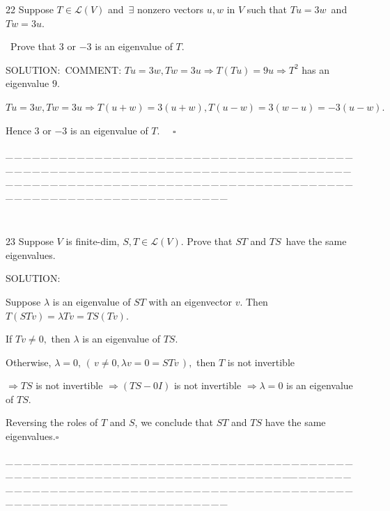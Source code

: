 \documentclass[a4paper, 11pt, UTF8]{article}
\def\Lm{\mathcal{L}}
\begin{document}
\begin{large}
{\timesbf\Large 22} {\timessl\Large 
Suppose $T\in\Lm(V)$ and $\,\exists$ nonzero vectors $u,w$ in $V$ such that $Tu = 3w$ \,{\normalsize\timessl and}\, $Tw = 3u$.}\par\quad\,
{\timessl\Large Prove that $3$ or $-3$ is an eigenvalue of $T$.
}\par
{\timesbf S\footnotesize{OLUTION:}}\,\,\,{\small C{\scriptsize OMMENT}: $Tu=3w,Tw=3u\Rightarrow T(Tu)=9u\Rightarrow T^2$ has an eigenvalue $9.$}\par\quad
$Tu=3w,Tw=3u\Rightarrow T(u+w)=3(u+w),T(u-w)=3(w-u)=-3(u-w).$\par\quad
Hence $3$ or $-3$ is an eigenvalue of $T.$ $\quad\square$\par
{\tiny \_\,\_\,\_\,\_\,\_\,\_\,\_\,\_\,\_\,\_\,\_\,\_\,\_\,\_\,\_\,\_\,\_\,\_\,\_\,\_\,\_\,\_\,\_\,\_\,\_\,\_\,\_\,\_\,\_\,\_\,\_\,\_\,\_\,\_\,\_\,\_\,\_\,\_\,\_\,\_\,\_\,\_\,\_\,\_\,\_\,\_\,\_\,\_\,\_\,\_\,\_\,\_\,\_\,\_\,\_\,\_\,\_\,\_\,\_\,\_\,\_\,\_\,\_\,\_\,\_\,\_\,\_\,\_\,\_\,\_\,\_\_\,\_\,\_\,\_\,\_\,\_\,\_\,\_\,\_\,\_\,\_\,\_\,\_\,\_\,\_\,\_\,\_\,\_\,\_\,\_\,\_\,\_\,\_\,\_\,\_\,\_\,\_\,\_\,\_\,\_\,\_\,\_\,\_\,\_\,\_\,\_\,\_\,\_\,\_\,\_\,\_\,\_\,\_\,\_\,\_\,\_\,\_\,\_\,\_\,\_\,\_\,\_\,\_\,\_\,\_\,\_\,\_\,\_\,\_\,\_\,\_\,\_\,\_\,\_\,\_\,\_\,\_\,\_\,\_\,\_\,\_}\par{\tiny\,\par}

{\timesbf\Large 23} {\timessl\Large 
Suppose $V$ is finite-dim, $S, T\in\Lm(V)$. Prove that $ST$ and $TS$\, have the same eigenvalues.}\par
{\timesbf S\footnotesize{OLUTION:}}\par\quad
Suppose $\lambda$ is an eigenvalue of $ST$ with an eigenvector $v.$ Then $T(STv)=\lambda Tv=TS(Tv).$\par\quad
If $Tv\neq 0,$ then $\lambda$ is an eigenvalue of $TS.$\par\quad
Otherwise, $\lambda=0,\,(\,v\neq 0,\lambda v=0=STv\,),$ then $T$ is not invertible\par\qquad\qquad
 $\Rightarrow TS$ is not invertible $\Rightarrow (TS-0I)$ is not invertible $\Rightarrow \lambda=0$ is an eigenvalue of $TS.$\par\quad
Reversing the roles of $T$ and $S$, we conclude that $ST$ and $TS$ have the same eigenvalues.\quad$\square$\par
{\tiny \_\,\_\,\_\,\_\,\_\,\_\,\_\,\_\,\_\,\_\,\_\,\_\,\_\,\_\,\_\,\_\,\_\,\_\,\_\,\_\,\_\,\_\,\_\,\_\,\_\,\_\,\_\,\_\,\_\,\_\,\_\,\_\,\_\,\_\,\_\,\_\,\_\,\_\,\_\,\_\,\_\,\_\,\_\,\_\,\_\,\_\,\_\,\_\,\_\,\_\,\_\,\_\,\_\,\_\,\_\,\_\,\_\,\_\,\_\,\_\,\_\,\_\,\_\,\_\,\_\,\_\,\_\,\_\,\_\,\_\,\_\_\,\_\,\_\,\_\,\_\,\_\,\_\,\_\,\_\,\_\,\_\,\_\,\_\,\_\,\_\,\_\,\_\,\_\,\_\,\_\,\_\,\_\,\_\,\_\,\_\,\_\,\_\,\_\,\_\,\_\,\_\,\_\,\_\,\_\,\_\,\_\,\_\,\_\,\_\,\_\,\_\,\_\,\_\,\_\,\_\,\_\,\_\,\_\,\_\,\_\,\_\,\_\,\_\,\_\,\_\,\_\,\_\,\_\,\_\,\_\,\_\,\_\,\_\,\_\,\_\,\_\,\_\,\_\,\_\,\_\,\_}\par


\end{large}
\end{document}
